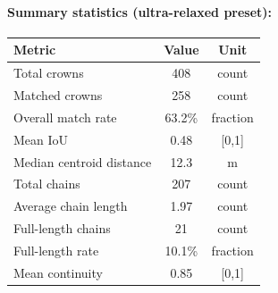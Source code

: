 \paragraph{Summary statistics (ultra-relaxed preset):}
\begin{center}
\begin{tabular}{lcc}
\toprule
\textbf{Metric} & \textbf{Value} & \textbf{Unit} \\
\midrule
Total crowns & 408 & count \\
Matched crowns & 258 & count \\
Overall match rate & 63.2\% & fraction \\
Mean IoU & 0.48 & [0,1] \\
Median centroid distance & 12.3 & m \\
\midrule
Total chains & 207 & count \\
Average chain length & 1.97 & count \\
Full-length chains & 21 & count \\
Full-length rate & 10.1\% & fraction \\
Mean continuity & 0.85 & [0,1] \\
\bottomrule
\end{tabular}
\end{center}
